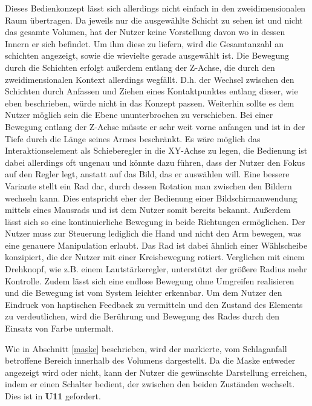 Dieses Bedienkonzept lässt sich allerdings nicht einfach in den zweidimensionalen Raum übertragen. Da jeweils nur die ausgewählte Schicht zu sehen ist und nicht das gesamte Volumen, hat der Nutzer keine Vorstellung davon wo in dessen Innern er sich befindet. Um ihm diese zu liefern, wird die Gesamtanzahl an schichten angezeigt, sowie die wievielte gerade ausgewählt ist. 
Die Bewegung durch die Schichten erfolgt außerdem entlang der Z-Achse, die durch den zweidimensionalen Kontext allerdings wegfällt. D.h. der Wechsel zwischen den Schichten durch Anfassen und Ziehen eines Kontaktpunktes entlang dieser, wie eben beschrieben, würde nicht in das Konzept passen. 
Weiterhin sollte es dem Nutzer möglich sein die Ebene ununterbrochen zu verschieben. Bei einer Bewegung entlang der Z-Achse müsste er sehr weit vorne anfangen und ist in der Tiefe durch die Länge seines Armes beschränkt. Es wäre möglich das Interaktionselement als Schieberegler in die XY-Achse zu legen, die Bedienung ist dabei allerdings oft ungenau und könnte dazu führen, dass der Nutzer den Fokus auf den Regler legt, anstatt auf das Bild, das er auswählen will. Eine bessere Variante stellt ein Rad dar, durch dessen Rotation man zwischen den Bildern wechseln kann. Dies entspricht eher der Bedienung einer Bildschirmanwendung mittels eines Mausrads und ist dem Nutzer somit bereits bekannt. Außerdem lässt sich so eine kontinuierliche Bewegung in beide Richtungen ermöglichen. Der Nutzer muss zur Steuerung lediglich die Hand und nicht den Arm bewegen, was eine genauere Manipulation erlaubt. 
Das Rad ist dabei ähnlich einer Wählscheibe konzipiert, die der Nutzer mit einer Kreisbewegung rotiert. Verglichen mit einem Drehknopf, wie z.B. einem Lautstärkeregler, unterstützt der größere Radius mehr Kontrolle. Zudem lässt sich eine endlose Bewegung ohne Umgreifen realisieren und die Bewegung ist vom System leichter erkennbar. 
Um dem Nutzer den Eindruck von haptischen Feedback zu vermitteln und den Zustand des Elements zu verdeutlichen, wird die Berührung und Bewegung des Rades durch den Einsatz von Farbe untermalt.


Wie in Abschnitt \ref{maske} beschrieben, wird der markierte, vom Schlaganfall betroffene Bereich innerhalb des Volumens dargestellt. Da die Maske entweder angezeigt wird oder nicht, kann der Nutzer die gewünschte Darstellung erreichen, indem er einen Schalter bedient, der zwischen den beiden Zuständen wechselt. Dies ist in \textbf{U11} gefordert.

